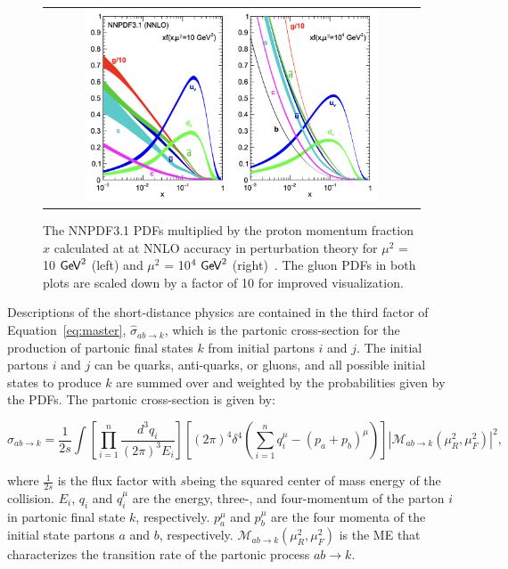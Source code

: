 \begin{figure}[tbh!]
 \begin{center}
 \begin{tabular}{c}
 \includegraphics[width=0.8\textwidth]{figures/Part1/QCD/PDF}
 \end{tabular}
 \caption{The NNPDF3.1 \acp{PDF} multiplied by the proton momentum fraction $x$ calculated at at NNLO accuracy in perturbation theory for $\mu^2$ = 10 $\textsf{GeV}^2$ (left) and $\mu^2$ = 10$^4~\textsf{GeV}^2$ (right)~\cite{NNPDF:2017mvq}. The gluon \acp{PDF} in both plots are scaled down by a factor of 10 for improved visualization.}
 \label{fig:PDF}
 \end{center}
\end{figure}

Descriptions of the short-distance physics are contained in the third factor of Equation~\ref{eq:master}, $\hat{\sigma}_{ab\rightarrow k}$, which is the partonic cross-section for the production of partonic final states $k$ from initial partons $i$ and $j$. The initial partons $i$ and $j$ can be quarks, anti-quarks, or gluons, and all possible initial states to produce $k$ are summed over and weighted by the probabilities given by the \acp{PDF}. The partonic cross-section is given by:

\begin{equation}
\hat{\sigma}_{ab\rightarrow k}=\frac{1}{2s}\int[\prod_{i=1}^{n}\frac{d^3q_{i}}{(2\pi)^3E_{i}}][(2\pi)^4\delta^4(\sum_{i=1}^{n}q_{i}^{\mu}-(p_{a}+p_{b})^{\mu})]|\mathcal{M}_{ab\rightarrow k}(\mu_{R}^2,\mu_{F}^2)|^2,
\end{equation}

where $\frac{1}{2s}$ is the flux factor with $s$being the squared center of mass energy of the collision. $E_{i}$, $q_{i}$ and $q_{i}^{\mu}$ are the energy, three-, and four-momentum of the parton $i$ in partonic final state $k$, respectively. $p_{a}^{\mu}$ and $p_{b}^{\mu}$ are the four momenta of the initial state partons $a$ and $b$, respectively. $\mathcal{M}_{ab\rightarrow k}(\mu_{R}^2,\mu_{F}^2)$ is the \ac{ME} that characterizes the transition rate of the partonic process $ab\rightarrow k$.

